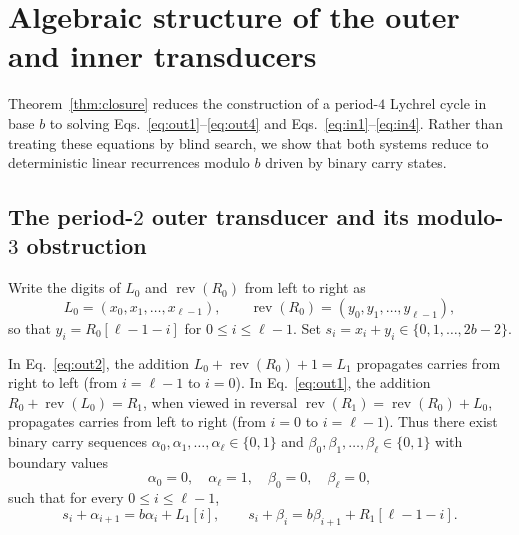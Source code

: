 \documentclass[12pt,reqno]{article}
\DeclareMathOperator{\Rev}{rev}
\begin{document}
\section{Algebraic structure of the outer and inner transducers}\label{sec:transducer}

Theorem~\ref{thm:closure} reduces the construction of a period-$4$ Lychrel cycle in base $b$ to solving Eqs.~\eqref{eq:out1}--\eqref{eq:out4} and Eqs.~\eqref{eq:in1}--\eqref{eq:in4}. Rather than treating these equations by blind search, we show that both systems reduce to deterministic linear recurrences modulo $b$ driven by binary carry states.

\subsection{The period-$2$ outer transducer and its modulo-$3$ obstruction}\label{subsec:outer}

Write the digits of $L_0$ and $\Rev(R_0)$ from left to right as
\begin{displaymath}
L_0 = (x_0, x_1, \ldots, x_{\ell-1}), \qquad \Rev(R_0) = (y_0, y_1, \ldots, y_{\ell-1}),
\end{displaymath}
so that $y_i = R_0[\ell-1-i]$ for $0 \leq i \leq \ell-1$. Set $s_i = x_i + y_i \in \{0, 1, \ldots, 2b-2\}$.

In Eq.~\eqref{eq:out2}, the addition $L_0 + \Rev(R_0) + 1 = L_1$ propagates carries from right to left (from $i = \ell-1$ to $i = 0$). In Eq.~\eqref{eq:out1}, the addition $R_0 + \Rev(L_0) = R_1$, when viewed in reversal $\Rev(R_1) = \Rev(R_0) + L_0$, propagates carries from left to right (from $i = 0$ to $i = \ell-1$). Thus there exist binary carry sequences $\alpha_0, \alpha_1, \ldots, \alpha_\ell \in \{0, 1\}$ and $\beta_0, \beta_1, \ldots, \beta_\ell \in \{0, 1\}$ with boundary values
\begin{equation}\label{eq:ab_bound}
\alpha_0 = 0, \quad \alpha_\ell = 1, \quad \beta_0 = 0, \quad \beta_\ell = 0,
\end{equation}
such that for every $0 \leq i \leq \ell-1$,
\begin{equation}\label{eq:step1_pos}
s_i + \alpha_{i+1} = b \alpha_i + L_1[i], \qquad s_i + \beta_i = b \beta_{i+1} + R_1[\ell-1-i].
\end{equation}
\end{document}
